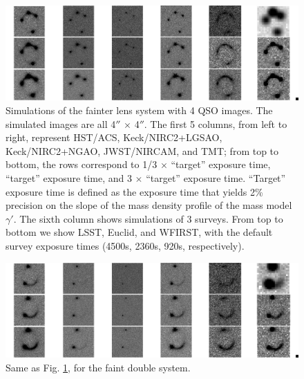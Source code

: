 \documentclass[a4paper,11pt]{article}
\begin{document}
{%
\begin{figure}
\begin{center}
\includegraphics[width=1.0\textwidth]{figures/fainter_system_4QSOimages_all.png}
\end{center}
\caption{Simulations of the fainter lens system with 4 QSO images. The simulated images are all 4$''$ $\times$ 4$''$. The first 5 columns, from left to right, represent HST/ACS, Keck/NIRC2+LGSAO, Keck/NIRC2+NGAO, JWST/NIRCAM, and TMT; from top to bottom, the rows correspond to 1/3 $\times$ ``target'' exposure time, ``target'' exposure time, and 3 $\times$ ``target'' exposure time. ``Target'' exposure time is defined as the exposure time that yields 2\% precision on the slope of the mass density profile of the mass model $\gamma'$. The sixth column shows simulations of 3 surveys. From top to bottom we show LSST, Euclid, and WFIRST, with the default survey exposure times (4500s, 2360s, 920s, respectively).}
\label{fig:fainter_4QSOimages_montage}
\end{figure}


\begin{figure}
\begin{center}
\includegraphics[width=1.0\textwidth]{figures/fainter_system_2QSOimages_all.png}
\end{center}
\caption{Same as Fig. \ref{fig:fainter_4QSOimages_montage}, for the faint double system.}
\label{fig:fainter_2QSOimages_montage}
\end{figure}

}
\end{document}
